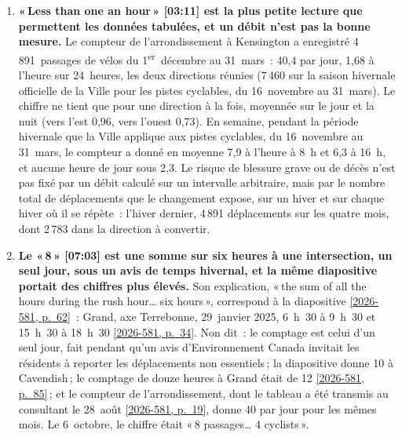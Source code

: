 \documentclass[11pt,letterpaper]{article}
\newcommand{\pagesurl}{https://openmobilitydata.github.io/Terrebonne-access-requests}
\newcommand{\cliptime}[1]{\textsf{\small[#1]}}
\newcommand{\pgl}[2]{\href{\pagesurl/2026-581/raw/01_emails_mandate_counts.pdf\#page=#1}{\textsf{\small[2026-581, p.~#2]}}}
\newcommand{\pg}[1]{\pgl{#1}{#1}}
\begin{document}
\begin{enumerate}[nosep]
  \item \begin{minipage}[t]{\linewidth}\textbf{«\,Less than one an hour\,» \cliptime{03:11} est la plus petite lecture que permettent les données tabulées, et un débit n'est pas la bonne mesure.} Le compteur de l'arrondissement à Kensington a enregistré 4\,891~passages de vélos du 1\textsuperscript{er}~décembre au 31~mars~: 40{,}4 par jour, 1{,}68 à l'heure sur 24~heures, les deux directions réunies (7\,460 sur la saison hivernale officielle de la Ville pour les pistes cyclables, du 16~novembre au 31~mars). Le chiffre ne tient que pour une direction à la fois, moyennée sur le jour et la nuit (vers l'est 0{,}96, vers l'ouest 0{,}73). En semaine, pendant la période hivernale que la Ville applique aux pistes cyclables, du 16~novembre au 31~mars, le compteur a donné en moyenne 7{,}9 à l'heure à 8~h et 6{,}3 à 16~h, et aucune heure de jour sous 2{,}3. Le risque de blessure grave ou de décès n'est pas fixé par un débit calculé sur un intervalle arbitraire, mais par le nombre total de déplacements que le changement expose, sur un hiver et sur chaque hiver où il se répète~: l'hiver dernier, 4\,891 déplacements sur les quatre mois, dont 2\,783 dans la direction à convertir.\end{minipage}\vspace{0.35em}
  \item \begin{minipage}[t]{\linewidth}\textbf{Le «\,8\,» \cliptime{07:03} est une somme sur six heures à une intersection, un seul jour, sous un avis de temps hivernal, et la même diapositive portait des chiffres plus élevés.} Son explication, «\,the sum of all the hours during the rush hour… six hours\,», correspond à la diapositive \pg{62}~: Grand, axe Terrebonne, 29~janvier 2025, 6~h~30 à 9~h~30 et 15~h~30 à 18~h~30 \pg{34}. Non dit~: le comptage est celui d'un seul jour, fait pendant qu'un avis d'Environnement Canada invitait les résidents à reporter les déplacements non essentiels\,; la diapositive donne 10 à Cavendish\,; le comptage de douze heures à Grand était de 12 \pg{85}\,; et le compteur de l'arrondissement, dont le tableau a été transmis au consultant le 28~août \pg{19}, donne 40 par jour pour les mêmes mois. Le 6~octobre, le chiffre était «\,8 passages… 4 cyclists\,».\end{minipage}\vspace{0.35em}

\end{enumerate}
\end{document}
